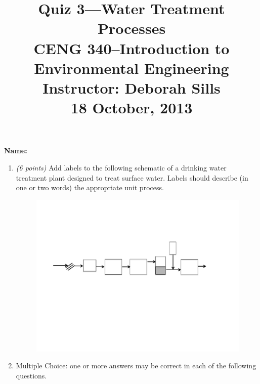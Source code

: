\documentclass[12pt,letterpaper]{article}
\begin{document}
\setlength{\parindent}{0cm} 


\frenchspacing


\title {\Large{\textbf{Quiz 3---Water Treatment Processes}}\\ \large{CENG 340--Introduction to Environmental Engineering\\
Instructor: Deborah Sills\\ \textbf{18 October, 2013}}}
\author {}
\date {}
\maketitle

\vspace{-0.2 in}
\textbf{\large{Name:}}\\

\begin{enumerate}

\item \emph{(6 points)} Add labels to the following schematic of a drinking water treatment plant designed to treat surface water.  Labels should describe (in one or two words) the appropriate unit process.

\vspace{0.4in}

\begin{figure}
\centering
\includegraphics[width=1\textwidth]{surface}
\end{figure}

\vspace{0.7in}

\item Multiple Choice: one or more answers may be correct in each of the following questions.


\end{enumerate}
\end{document}
